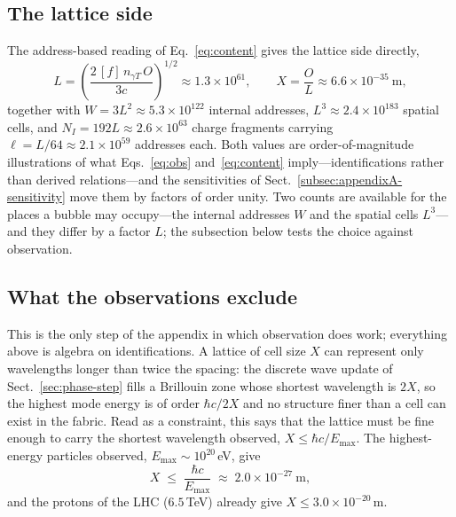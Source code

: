 \documentclass[a4paper]{article}
\begin{document}
\subsection{The lattice side}
The address-based reading of Eq.~\eqref{eq:content} gives the lattice side directly,
\[
L=\left(\frac{2\,[f]\,n_{\gamma T}\,O}{3c}\right)^{1/2}\approx1.3\times10^{61},
\qquad
X=\frac{O}{L}\approx6.6\times10^{-35}\ \mathrm{m},
\]
together with $W=3L^{2}\approx5.3\times10^{122}$ internal addresses, $L^{3}\approx2.4\times10^{183}$ spatial cells, and $N_I=192L\approx2.6\times10^{63}$ charge fragments carrying $\ell=L/64\approx2.1\times10^{59}$ addresses each.  Both values are order-of-magnitude illustrations of what Eqs.~\eqref{eq:obs} and~\eqref{eq:content} imply---identifications rather than derived relations---and the sensitivities of Sect.~\ref{subsec:appendixA-sensitivity} move them by factors of order unity.  Two counts are available for the places a bubble may occupy---the internal addresses $W$ and the spatial cells $L^{3}$---and they differ by a factor $L$; the subsection below tests the choice against observation.

\subsection{What the observations exclude}
This is the only step of the appendix in which observation does work; everything above is algebra on identifications.  A lattice of cell size $X$ can represent only wavelengths longer than twice the spacing: the discrete wave update of Sect.~\ref{sec:phase-step} fills a Brillouin zone whose shortest wavelength is $2X$, so the highest mode energy is of order $\hbar c/2X$ and no structure finer than a cell can exist in the fabric.  Read as a constraint, this says that the lattice must be fine enough to carry the shortest wavelength observed, $X\le\hbar c/E_{\max}$.  The highest-energy particles observed, $E_{\max}\sim10^{20}$\,eV, give
\begin{equation}
X\;\le\;\frac{\hbar c}{E_{\max}}\;\approx\;2.0\times10^{-27}\ \mathrm{m},
\label{eq:liv-bound}
\end{equation}
and the protons of the LHC ($6.5$\,TeV) already give $X\le3.0\times10^{-20}$\,m.
\end{document}
